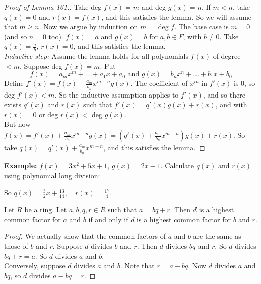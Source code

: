 \documentclass[twoside]{scrartcl}
\begin{document}
\begin{proof}[Proof of Lemma 161.]
	Take deg $f(x) = m$ and deg $g(x) = n$. If $m < n$, take $q(x) =0$ and $r(x) = f(x)$, and this satisfies the lemma. So we will assume that $m \geq n$. Now we argue by induction on $m = $ deg $f$. The base case is $m = 0$ (and so $n = 0$ too). $f(x) = a$ and $g(x) = b$ for $a,b \in F$, with $b \neq 0$. Take $q(x) = \frac{a}{b}$, $r(x) = 0$, and this satisfies the lemma.\\  
	\textit{Inductive step:} Assume the lemma holds for all polynomials $f(x)$ of degree $<m$. Suppose deg $f(x) = m$. Put \[f(x) = a_mx^m + \dots + a_1x + a_0 \text{ and } g(x) = b_nx^n + \dots + b_1x + b_0\] Define $f'(x) = f(x) - \frac{a_m}{b_n}x^{m-n}g(x)$. The coefficient of $x^m$ in $f'(x)$ is $0$, so deg $f'(x) < m$. So the inductive assumption applies to $f'(x)$, and so there exists $q'(x)$ and $r(x)$ such that $f'(x) = q'(x)g(x) + r(x)$, and with $r(x) = 0$ or deg $r(x) <$ deg $g(x)$.\vspace*{5pt}\\ But now $f(x) = f'(x) + \frac{a_m}{b_n}x^{m-n}g(x) = (q'(x) + \frac{a_m}{b_n}x^{m-n})g(x) + r(x).$ So take $q(x) = q'(x) + \frac{a_m}{b_n}x^{m-n}$, and this satisfies the lemma.
\end{proof}\vspace*{5pt}

 \textbf{Example:} $f(x) = 3x^2 + 5x + 1$, $g(x)= 2x -1$. Calculate $q(x)$ and $r(x)$ using polynomial long division:\\


So $q(x) = \frac{3}{2}x + \frac{13}{14}, \quad r(x) = \frac{17}{4}$. \\

\begin{proposition} Let $R$ be a ring. Let $a,b,q,r \in R$ such that $a = bq + r$. Then $d$ is a highest common factor for $a$ and $b$ if and only if $d$ is a highest common factor for $b$ and $r$.	
\end{proposition}

\begin{proof}
We actually show that the common factors of $a$ and $b$ are the same as those of $b$ and $r$. Suppose $d$ divides $b$ and $r$. Then $d$ divides $bq$ and $r$. So $d$ divides $bq + r = a$. So $d$ divides $a$ and $b$.\\
Conversely, suppose $d$ divides $a$ and $b$. Note that $r = a - bq$. Now $d$ divides $a$ and $bq$, so $d$ divides $a - bq = r$.	
\end{proof}\vspace*{5pt}
\end{document}
